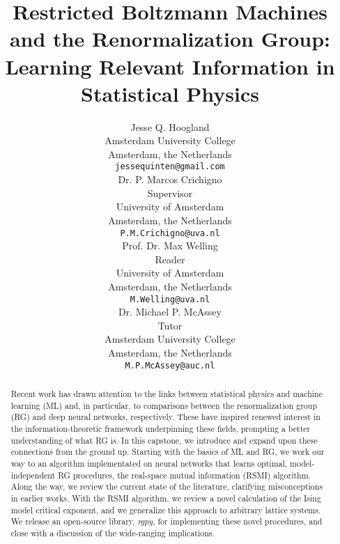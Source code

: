 \documentclass[12pt]{report}
\title{Restricted Boltzmann Machines and the Renormalization Group:
  Learning Relevant Information in Statistical Physics}
\author{%
  Jesse Q\@. Hoogland \\
  Amsterdam University College\\
  Amsterdam, the Netherlands \\
  \texttt{jessequinten@gmail.com} \\
  \AND{}
  Dr\@. P\@. Marcos Crichigno \\
  Supervisor \\
  University of Amsterdam\\
  Amsterdam, the Netherlands \\
  \texttt{P.M.Crichigno@uva.nl} \\
  \And{}
  Prof\@. Dr\@. Max Welling \\
  Reader \\
  University of Amsterdam\\
  Amsterdam, the Netherlands\\
  \texttt{M.Welling@uva.nl}\\
  \And{}
  Dr\@. Michael P\@. McAssey \\
  Tutor \\
  Amsterdam University College\\
  Amsterdam, the Netherlands\\
  \texttt{M.P.McAssey@auc.nl} \\
}
\begin{document}
\maketitle
\begin{abstract}
  Recent work has drawn attention to the links between statistical
  physics and machine learning (ML) and, in particular, to comparisons
  between the renormalization group (RG) and deep neural networks,
  respectively. These have inspired renewed interest in the
  information-theoretic framework underpinning these fields, prompting
  a better understanding of what RG is. In this
  capstone, we introduce and expand upon these connections from the
  ground up. Starting with the basics of ML and RG, we work our way to
  an algorithm implementated on neural networks that learns optimal,
  model-independent RG procedures, the real-space mutual information
  (RSMI) algorithm. Along the way, we review the current state of the
  literature, clarifying misconceptions in earlier works.  With the
  RSMI algorithm, we review a novel calculation of the Ising model
  critical exponent, and we generalize this approach to arbitrary
  lattice systems.  We release an open-source library, \textit{rgpy},
  for implementing these novel procedures, and close with a discussion
  of the wide-ranging implications.
\end{abstract}
%
%
\tableofcontents



















 
\end{document}

